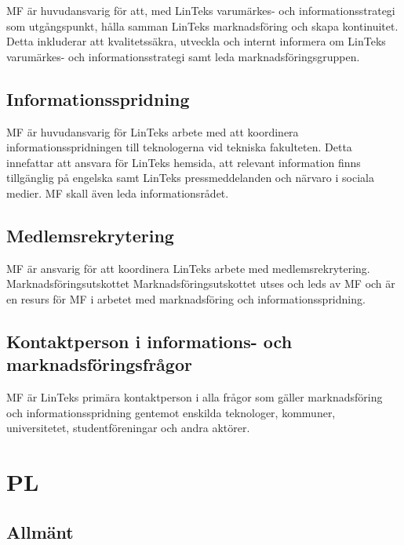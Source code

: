 MF är huvudansvarig för att, med LinTeks varumärkes- och
informationsstrategi som utgångspunkt, hålla samman LinTeks
marknadsföring och skapa kontinuitet. Detta inkluderar att
kvalitetssäkra, utveckla och internt informera om LinTeks varumärkes-
och informationsstrategi samt leda marknadsföringsgruppen.

\hypertarget{informationsspridning}{%
\subsection{Informationsspridning}\label{informationsspridning}}

MF är huvudansvarig för LinTeks arbete med att koordinera
informationsspridningen till teknologerna vid tekniska fakulteten. Detta
innefattar att ansvara för LinTeks hemsida, att relevant information
finns tillgänglig på engelska samt LinTeks pressmeddelanden och närvaro
i sociala medier. MF skall även leda informationsrådet.

\hypertarget{medlemsrekrytering}{%
\subsection{Medlemsrekrytering}\label{medlemsrekrytering}}

MF är ansvarig för att koordinera LinTeks arbete med medlemsrekrytering.
Marknadsföringsutskottet Marknadsföringsutskottet utses och leds av MF
och är en resurs för MF i arbetet med marknadsföring och
informationsspridning.

\hypertarget{kontaktperson-i-informations--och-marknadsfuxf6ringsfruxe5gor}{%
\subsection{Kontaktperson i informations- och
marknadsföringsfrågor}\label{kontaktperson-i-informations--och-marknadsfuxf6ringsfruxe5gor}}

MF är LinTeks primära kontaktperson i alla frågor som gäller
marknadsföring och informationsspridning gentemot enskilda teknologer,
kommuner, universitetet, studentföreningar och andra aktörer.

\hypertarget{pl}{%
\section{PL}\label{pl}}

\hypertarget{allmuxe4nt-6}{%
\subsection{Allmänt}\label{allmuxe4nt-6}}


